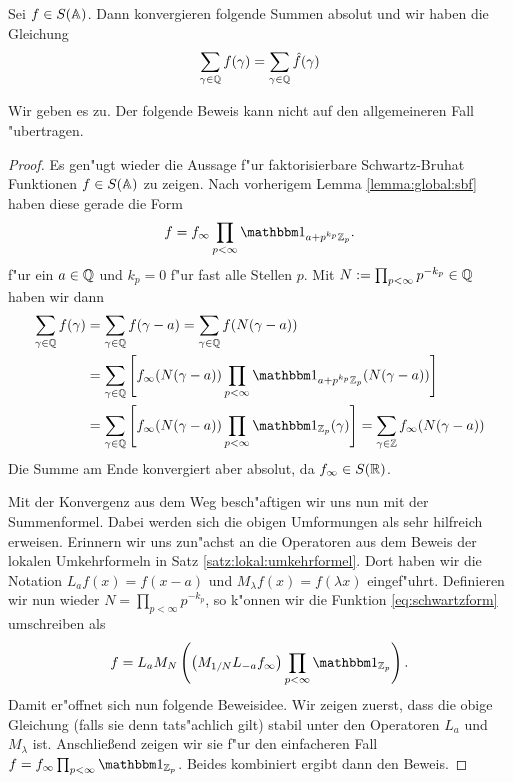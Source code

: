 	\begin{satz}
	\label{satz:global:poisson}
		Sei $f \in S(\mathbb{A})$. Dann konvergieren folgende Summen absolut und wir haben die Gleichung
		\begin{align}
			\sum_{\gamma \in \mathbb{Q}} {f(\gamma)} = \sum_{\gamma \in \mathbb{Q}}{\hat{f}(\gamma)}
		\end{align}
	\end{satz}
	Wir geben es zu. Der folgende Beweis kann nicht auf den allgemeineren Fall "ubertragen.
	\begin{proof}
		Es gen"ugt wieder die Aussage f"ur faktorisierbare Schwartz-Bruhat Funktionen $f \in S(\mathbb{A})$ zu zeigen.
		Nach vorherigem Lemma \ref{lemma:global:sbf} haben diese gerade die Form
		\begin{align}
		\label{eq:schwartzform}
			f = f_\infty\prod_{p<\infty} \ind_{a+p^{k_p}\Zp}.
		\end{align}
		f"ur ein $a \in \mathbb{Q}$ und $k_p = 0$ f"ur fast alle Stellen $p$.
		Mit $N:=\prod_{p<\infty} p^{-k_p} \in \mathbb{Q}$ haben wir dann
		\begin{align*}
			\sum_{\gamma \in \K} {f(\gamma)} 	&= 	\sum_{\gamma \in \K} f(\gamma - a)
												= 	\sum_{\gamma \in \K} f(N(\gamma - a)) \\
												&= 	\sum_{\gamma \in \K} \left[ f_\infty (N(\gamma - a))  \prod_{p< \infty} \ind_{a+p^{k_p}\Zp}(N(\gamma - a)) \right] \\
												&= 	\sum_{\gamma \in \K} \left[ f_\infty (N(\gamma - a))  \prod_{p< \infty} \ind_{\Zp}(\gamma) \right]
												=	\sum_{\gamma \in \Z} f_\infty (N(\gamma - a))
		\end{align*}
		Die Summe am Ende konvergiert aber absolut, da $f_\infty \in S(\mathbb{R})$.
		
		Mit der Konvergenz aus dem Weg besch"aftigen wir uns nun mit der Summenformel.
		Dabei werden sich die obigen Umformungen als sehr hilfreich erweisen.
		Erinnern wir uns zun"achst an die Operatoren aus dem Beweis der lokalen Umkehrformeln in Satz \ref{satz:lokal:umkehrformel}.
		Dort haben wir die Notation $L_a f(x) = f(x-a)$ und $M_\lambda f(x) = f(\lambda x)$ eingef"uhrt.
		Definieren wir nun wieder $N= \prod_{p<\infty} p^{-k_p}$, so k"onnen wir die Funktion \ref{eq:schwartzform} umschreiben als
		\begin{align*}
			f = L_a M_{N}\left( \left(M_{1/N} L_{-a} f_\infty\right) \prod_{p<\infty}\ind_{\Zp}\right).
		\end{align*}
		Damit er"offnet sich nun folgende Beweisidee. 
		Wir zeigen zuerst, dass die obige Gleichung (falls sie denn tats"achlich gilt) stabil unter den Operatoren $L_a$ und $M_\lambda$ ist.
		Anschließend zeigen wir sie f"ur den einfacheren Fall $f=f_\infty \prod_{p<\infty}\ind_{\Zp}$.
		Beides kombiniert ergibt dann den Beweis.
		

\end{proof}
